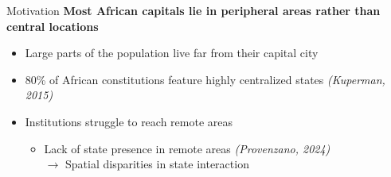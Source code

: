 \documentclass[10pt]{beamer}
\begin{document}
\begin{frame}{Motivation}
    \centering\textbf{Most African capitals lie in peripheral areas rather than central locations}\vspace{1em}
    \begin{itemize}\setlength\itemsep{1em}
        \item Large parts of the population live far from their capital city
        \item 80\% of African constitutions feature highly centralized states \textit{(Kuperman, 2015)}
        \item Institutions struggle to reach remote areas
        \begin{itemize}\vspace{0.5em}
            \item Lack of state presence in remote areas \textit{(Provenzano, 2024)}\vspace{0.5em}\\
            $\rightarrow{}$ Spatial disparities in state interaction

        \end{itemize}
    \end{itemize}
\end{frame}
\end{document}
